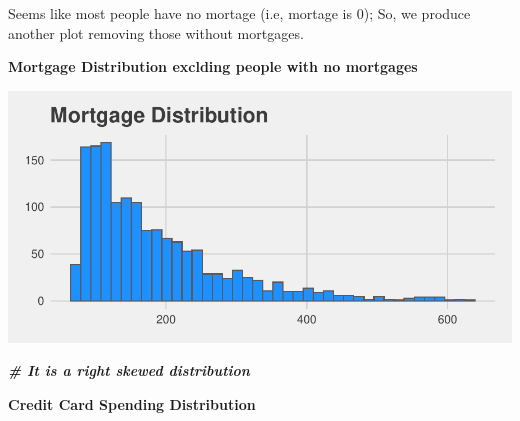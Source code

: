 \documentclass[
]{article}
\newenvironment{Shaded}{\begin{snugshade}}{\end{snugshade}}
\newcommand{\CommentTok}[1]{\textcolor[rgb]{0.00,0.40,1.00}{\textbf{\textit{#1}}}}
\newcommand{\DataTypeTok}[1]{\textcolor[rgb]{0.74,0.68,0.62}{\underline{#1}}}
\newcommand{\DecValTok}[1]{\textcolor[rgb]{0.27,0.67,0.26}{#1}}
\newcommand{\KeywordTok}[1]{\textcolor[rgb]{0.26,0.66,0.93}{\textbf{#1}}}
\newcommand{\NormalTok}[1]{\textcolor[rgb]{0.74,0.68,0.62}{#1}}
\newcommand{\OperatorTok}[1]{\textcolor[rgb]{0.74,0.68,0.62}{#1}}
\newcommand{\StringTok}[1]{\textcolor[rgb]{0.02,0.61,0.04}{#1}}
\begin{document}
Seems like most people have no mortage (i.e, mortage is 0); So, we
produce another plot removing those without mortgages.

\textbf{Mortgage Distribution exclding people with no mortgages}

\begin{Shaded}
\end{Shaded}

\includegraphics{Bank_Loan_Classification_files/figure-latex/unnamed-chunk-12-1.pdf}

\begin{Shaded}
\begin{Highlighting}[]
\CommentTok{# It is a right skewed distribution}
\end{Highlighting}
\end{Shaded}

\textbf{Credit Card Spending Distribution}
\end{document}
